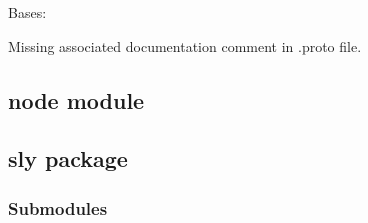 \documentclass[letterpaper,10pt,english]{sphinxmanual}
\begin{document}

\begin{fulllineitems}
\label{\detokenize{common/leotest_pb2_grpc:leotest_pb2_grpc.LeotestOrchestratorStub}}
\pysigstartsignatures
{}
\pysigstopsignatures
\sphinxAtStartPar
Bases: 

\sphinxAtStartPar
Missing associated documentation comment in .proto file.

\end{fulllineitems}


\begin{fulllineitems}
\label{\detokenize{common/leotest_pb2_grpc:leotest_pb2_grpc.add_LeotestOrchestratorServicer_to_server}}
\pysigstartsignatures
{}
\pysigstopsignatures
\end{fulllineitems}


\sphinxstepscope


\subsection{node module}
\label{\detokenize{common/node:module-node}}\label{\detokenize{common/node:node-module}}\label{\detokenize{common/node::doc}}
\sphinxstepscope


\subsection{sly package}
\label{\detokenize{common/sly:sly-package}}\label{\detokenize{common/sly::doc}}

\subsubsection{Submodules}
\label{\detokenize{common/sly:submodules}}
\end{document}
